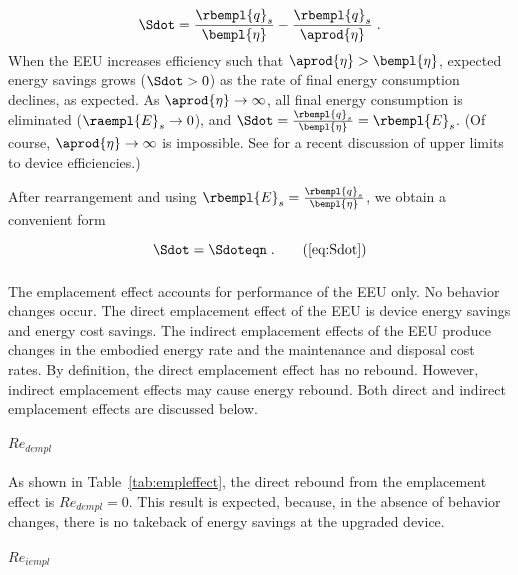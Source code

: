 \begin{equation}
  \Sdot = \frac{\rbempl{q}_s}{\bempl{\eta}} - \frac{\rbempl{q}_s}{\aprod{\eta}} \; .
\end{equation}
%
When the EEU increases efficiency such that $\aprod{\eta} > \bempl{\eta}$,
expected energy savings grows ($\Sdot > 0$)
as the rate of final energy consumption declines,
as expected.
As $\aprod{\eta} \rightarrow \infty$,
all final energy consumption is eliminated ($\raempl{E}_s \rightarrow 0$), and
$\Sdot = \frac{\rbempl{q}_s}{\bempl{\eta}} = \rbempl{E}_s$.
(Of course, $\aprod{\eta} \rightarrow \infty$ is impossible. 
See \citet{Paoli:2020aa} for a recent discussion of upper limits to device efficiencies.)

After rearrangement and using $\rbempl{E}_s = \frac{\rbempl{q}_s}{\bempl{\eta}}$, 
we obtain a convenient form

\begin{equation}
  \Sdot = \Sdoteqn \; .  \tag{\ref{eq:Sdot}}
\end{equation}


\subsubsection{\Empleffect{}}
\label{sec:Re_emp}

The emplacement effect accounts for performance of the EEU only.
No behavior changes occur.
The direct emplacement effect of the EEU is device energy savings and energy cost savings.
The indirect emplacement effects of the EEU produce changes in the embodied energy rate and
the maintenance and disposal cost rates.
By definition, the direct emplacement effect has no rebound. 
However, indirect emplacement effects may cause energy rebound.
Both direct and indirect emplacement effects are discussed below.


\paragraph{$Re_{dempl}$}
\label{sec:Re_dempl}

As shown in Table~\ref{tab:empleffect},
the direct rebound from the emplacement effect is
$Re_{dempl} = 0$.
This result is expected, 
because, in the absence of behavior changes,
there is no takeback of energy savings
at the upgraded device.


\paragraph{$Re_{iempl}$} 
\label{sec:Re_iempl}

